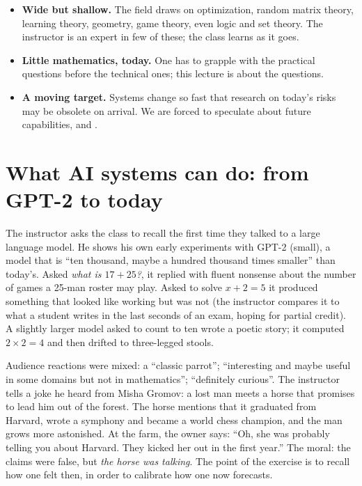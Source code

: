 \begin{takeaways}
\begin{itemize}
  \item \textbf{Wide but shallow.} The field draws on optimization, random matrix theory, learning theory, geometry, game theory, even logic and set theory. The instructor is an expert in few of these; the class learns as it goes.
  \item \textbf{Little mathematics, today.} One has to grapple with the practical questions before the technical ones; this lecture is about the questions.
  \item \textbf{A moving target.} Systems change so fast that research on today's risks may be obsolete on arrival. We are forced to speculate about future capabilities, and .
\end{itemize}
\end{takeaways}

\section{What AI systems can do: from GPT-2 to today}\label{sec:L1-capabilities}
The instructor asks the class to recall the first time they talked to a large language model. He shows his own early experiments with GPT-2 (small), a model that is
``ten thousand, maybe a hundred thousand times smaller'' than today's. Asked \emph{what is $17+25$?}, it replied with fluent nonsense about the number of games a
25-man roster may play. Asked to solve $x+2=5$ it produced something that looked like working but was not (the instructor compares it to what a student writes in the last
seconds of an exam, hoping for partial credit). A slightly larger model asked to count to ten wrote a poetic story; it computed $2\times2=4$ and then drifted to
three-legged stools.

\begin{discussion}
Audience reactions were mixed: a ``classic parrot''; ``interesting and maybe useful in some domains but not in mathematics''; ``definitely curious''. The instructor
tells a joke he heard from Misha Gromov: a lost man meets a horse that promises to lead him out of the forest. The horse mentions that it graduated from Harvard,
wrote a symphony and became a world chess champion, and the man grows more astonished. At the farm, the owner says: ``Oh, she was probably telling you about Harvard. They kicked her out in the first year.''
The moral: the claims were false, but \emph{the horse was talking}. The point of the exercise is to recall how one felt then, in order to calibrate how one now forecasts.
\end{discussion}

